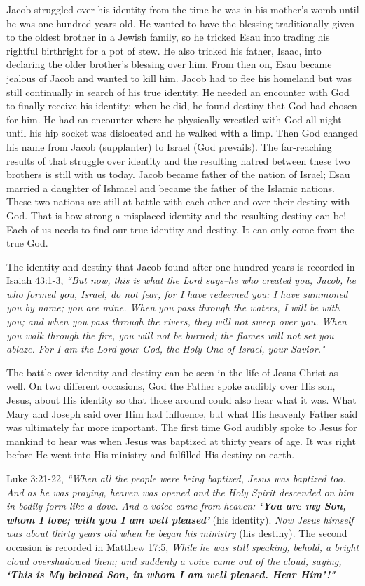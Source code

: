 \documentclass[oneside,12pt]{book}
\begin{document}
Jacob struggled over his identity from the time he was in his mother's womb until he was one hundred years old. He wanted to have the blessing traditionally given to the oldest brother in a Jewish family, so he tricked Esau into trading his rightful birthright for a pot of stew. He also tricked his father, Isaac, into declaring the older brother's blessing over him. From then on, Esau became jealous of Jacob and wanted to kill him. Jacob had to flee his homeland but was still continually in search of his true identity. He needed an encounter with God to finally receive his identity; when he did, he found destiny that God had chosen for him. He had an encounter where he physically wrestled with God all night until his hip socket was dislocated and he walked with a limp. Then God changed his name from Jacob (supplanter) to Israel (God prevails). The far-reaching results of that struggle over identity and the resulting hatred between these two brothers is still with us today. Jacob became father of the nation of Israel; Esau married a daughter of Ishmael and became the father of the Islamic nations. These two nations are still at battle with each other and over their destiny with God. That is how strong a misplaced identity and the resulting destiny can be! Each of us needs to find our true identity and destiny. It can only come from the true God.


The identity and destiny that Jacob found after one hundred years is recorded in Isaiah 43:1-3, \textit{``But now, this is what the Lord says--he who created you, Jacob, he who formed you, Israel, do not fear, for I have redeemed you: I have summoned you by name; you are mine. When you pass through the waters, I will be with you; and when you pass through the rivers, they will not sweep over you. When you walk through the fire, you will not be burned; the flames will not set you ablaze. For I am the Lord your God, the Holy One of Israel, your Savior."}

The battle over identity and destiny can be seen in the life of Jesus Christ as well. On two different occasions, God the Father spoke audibly over His son, Jesus, about His identity so that those around could also hear what it was. What Mary and Joseph said over Him had influence, but what His heavenly Father said was ultimately far more important. The first time God audibly spoke to Jesus for mankind to hear was when Jesus was baptized at thirty years of age. It was right before He went into His ministry and fulfilled His destiny on earth.

Luke 3:21-22, \textit{``When all the people were being baptized, Jesus was baptized too. And as he was praying, heaven was opened and the Holy Spirit descended on him in bodily form like a dove. And a voice came from heaven: \textbf{`You are my Son, whom I love; with you I am well pleased'}} (his identity). \textit{Now Jesus himself was about thirty years old when he began his ministry} (his destiny). The second occasion is recorded in Matthew 17:5, \textit{While he was still speaking, behold, a bright cloud overshadowed them; and suddenly a voice came out of the cloud, saying, \textbf{`This is My beloved Son, in whom I am well pleased. Hear Him'!"}}
\end{document}
